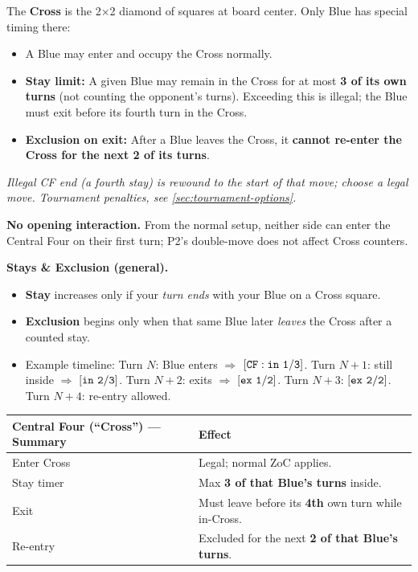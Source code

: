 \documentclass[11pt]{article}
\begin{document}
The \textbf{Cross} is the 2×2 diamond of squares at board center. Only Blue has special timing there:
\begin{itemize}
  \item A Blue may enter and occupy the Cross normally.
  \item \textbf{Stay limit:} A given Blue may remain in the Cross for at most \textbf{3 of its own turns} (not counting the opponent's turns). Exceeding this is illegal; the Blue must exit before its fourth turn in the Cross.
  \item \textbf{Exclusion on exit:} After a Blue leaves the Cross, it \textbf{cannot re-enter the Cross for the next 2 of its turns}.
\end{itemize}

\noindent\emph{Illegal CF end (a fourth stay) is rewound to the start of that move; choose a legal move. Tournament penalties, see \ref{sec:tournament-options}.}

\begin{tcolorbox}[enhanced,breakable,title={Rules Note --- Cross Timers \& the Opening Double-Move},
  colback=white,colframe=royal,boxrule=0.8pt]
\small
\textbf{No opening interaction.} From the normal setup, neither side can enter the Central Four on their first turn; P2's double-move does not affect Cross counters.

\textbf{Stays \& Exclusion (general).}
\begin{itemize}[leftmargin=1.1em,itemsep=0.2em]
  \item \textbf{Stay} increases only if your \emph{turn ends} with your Blue on a Cross square.
  \item \textbf{Exclusion} begins only when that same Blue later \emph{leaves} the Cross after a counted stay.
  \item Example timeline: Turn \(N\): Blue enters \(\Rightarrow\) \([{\tt CF:in~1/3}]\). Turn \(N{+}1\): still inside \(\Rightarrow\) \([{\tt in~2/3}]\). Turn \(N{+}2\): exits \(\Rightarrow\) \([{\tt ex~1/2}]\). Turn \(N{+}3\): \([{\tt ex~2/2}]\). Turn \(N{+}4\): re-entry allowed.
\end{itemize}
\end{tcolorbox}

\noindent\begin{tabularx}{\linewidth}{@{}l X@{}}
\toprule
\textbf{Central Four (``Cross'') --- Summary} & \textbf{Effect}\\
\midrule
Enter Cross & Legal; normal ZoC applies.\\
Stay timer & Max \textbf{3 of that Blue's turns} inside.\\
Exit & Must leave before its \textbf{4th} own turn while in-Cross.\\
Re-entry & Excluded for the next \textbf{2 of that Blue's turns}.\\
\bottomrule
\end{tabularx}
\end{document}
